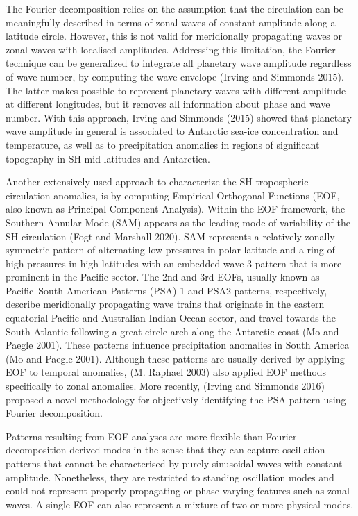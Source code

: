 \documentclass[smallextended]{svjour3}       %
\begin{document}
The Fourier decomposition relies on the assumption that the circulation can be meaningfully described in terms of zonal waves of constant amplitude along a latitude circle.
However, this is not valid for meridionally propagating waves or zonal waves with localised amplitudes.
Addressing this limitation, the Fourier technique can be generalized to integrate all planetary wave amplitude regardless of wave number, by computing the wave envelope (Irving and Simmonds 2015).
The latter makes possible to represent planetary waves with different amplitude at different longitudes, but it removes all information about phase and wave number.
With this approach, Irving and Simmonds (2015) showed that planetary wave amplitude in general is associated to Antarctic sea-ice concentration and temperature, as well as to precipitation anomalies in regions of significant topography in SH mid-latitudes and Antarctica.

Another extensively used approach to characterize the SH tropospheric circulation anomalies, is by computing Empirical Orthogonal Functions (EOF, also known as Principal Component Analysis).
Within the EOF framework, the Southern Annular Mode (SAM) appears as the leading mode of variability of the SH circulation (Fogt and Marshall 2020).
SAM represents a relatively zonally symmetric pattern of alternating low pressures in polar latitude and a ring of high pressures in high latitudes with an embedded wave 3 pattern that is more prominent in the Pacific sector.
The 2nd and 3rd EOFs, usually known as Pacific--South American Patterns (PSA) 1 and PSA2 patterns, respectively, describe meridionally propagating wave trains that originate in the eastern equatorial Pacific and Australian-Indian Ocean sector, and travel towards the South Atlantic following a great-circle arch along the Antarctic coast (Mo and Paegle 2001).
These patterns influence precipitation anomalies in South America (Mo and Paegle 2001).
Although these patterns are usually derived by applying EOF to temporal anomalies, (M. Raphael 2003) also applied EOF methods specifically to zonal anomalies.
More recently, (Irving and Simmonds 2016) proposed a novel methodology for objectively identifying the PSA pattern using Fourier decomposition.

Patterns resulting from EOF analyses are more flexible than Fourier decomposition derived modes in the sense that they can capture oscillation patterns that cannot be characterised by purely sinusoidal waves with constant amplitude.
Nonetheless, they are restricted to standing oscillation modes and could not represent properly propagating or phase-varying features such as zonal waves.
A single EOF can also represent a mixture of two or more physical modes.
\end{document}
